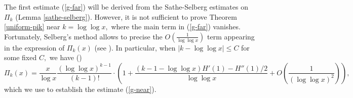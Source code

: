 \documentclass{article}
\begin{document}
The first estimate (\ref{g-far}) will be derived from the Sathe-Selberg estimates on $\Pi_k$ (Lemma \ref{sathe-selberg}). However, it is not sufficient to prove Theorem \ref{uniform-pik} near $k = \log\log x,$ where the main term in (\ref{g-far}) vanishes. Fortunately, Selberg's method allows to precise the $O\left(\frac{1}{\log\log x}\right)$ term appearing in the expression of $\Pi_k(x)$ (see \cite[Theorem II.6.5]{tenen-book}). In particular, when $|k - \log\log x| \le C$ for some fixed $C,$ we have (\cite[equation (34)]{balazard})
\begin{equation}\label{near-ll}
    \Pi_k(x) = \frac{x}{\log x}\frac{(\log\log x)^{k-1}}{(k-1)!}\cdot\left(1 + \frac{(k-1-\log \log x) H'(1) - H''(1)/2}{\log\log x} + O\left(\frac{1}{(\log\log x)^2}\right)\right),
\end{equation}
which we use to establish the estimate (\ref{g-near}).
\end{document}
